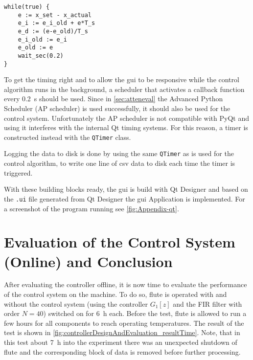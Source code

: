 \begin{lstlisting}[caption = PID controller implemented in pseudo code, label = lst:controllerDesignAndEvaluation-pidcode]
while(true) {
	e := x_set - x_actual
	e_i := e_i_old + e*T_s
	e_d := (e-e_old)/T_s
	e_i_old := e_i
	e_old := e
	wait_sec(0.2)
}
\end{lstlisting}

To get the timing right and to allow the \gls{gui} to be responsive while the control algorithm runs in the background, a scheduler that activates a callback function every \SI{0.2}{\second} should be used. Since in \autoref{sec:atteneval} the Advanced Python Scheduler (AP scheduler) is used successfully, it should also be used for the control system. Unfortunately the AP scheduler is not compatible with PyQt and using it interferes with the internal Qt timing systems. For this reason, a timer is constructed instead with the  \texttt{QTimer} class. \cite{qtimer}

Logging the data to disk is done by using the same \texttt{QTimer} as is used for the control algorithm, to write one line of \gls{csv} data to disk each time the timer is triggered.

With these building blocks ready, the \gls{gui} is build with Qt Designer and based on the \texttt{.ui} file generated from Qt Designer the \gls{gui} Application is implemented. For a screenshot of the program running see \autoref{fig:Appendix-qt}.









\newpage
\section{Evaluation of the Control System (Online) and Conclusion}
After evaluating the controller offline, it is now time to evaluate the performance of the control system on the machine. To do so, \gls{flute} is operated with and without the control system (using the controller $G_1[z]$ and the FIR filter with order $N=40$) switched on for \SI{6}{\hour} each. Before the test, \gls{flute} is allowed to run a few hours for all components to reach operating temperatures.
The result of the test is shown in \autoref{fig:controllerDesignAndEvaluation_resultTime}.
Note, that in this test about \SI{7}{\hour} into the experiment there was an unexpected shutdown of \gls{flute} and the corresponding block of data is removed before further processing.

